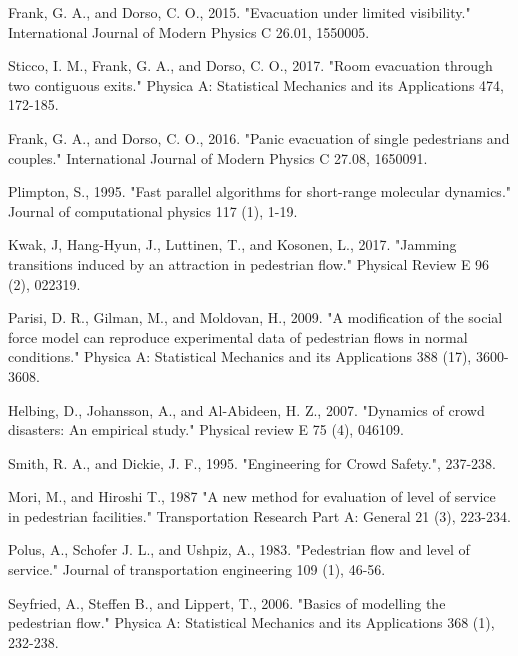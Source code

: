\documentclass[preprint,12pt]{elsarticle}
\begin{document}
\begin{thebibliography}{10}
Frank, G. A., and Dorso, C. O., 2015. "Evacuation under limited 
visibility." International Journal of Modern Physics C 26.01, 1550005.
{}

Sticco, I. M., Frank, G. A., and Dorso, C. O., 2017. "Room evacuation 
through two contiguous exits." Physica A: Statistical Mechanics and its 
Applications 474, 172-185. 
{}

Frank, G. A., and Dorso, C. O., 2016. "Panic evacuation of single pedestrians 
and couples." International Journal of Modern Physics C 27.08, 1650091. 
{}

Plimpton, S., 1995. "Fast parallel algorithms for short-range molecular 
dynamics." Journal of computational physics 117 (1), 1-19.
{}

Kwak, J, Hang-Hyun, J., Luttinen, T., and Kosonen, L., 2017. "Jamming 
transitions induced by an attraction in pedestrian flow." Physical Review E 96 
(2), 022319.
{}

Parisi, D. R., Gilman, M., and Moldovan, H., 2009. "A modification of the 
social force model can reproduce experimental data of pedestrian flows in normal 
conditions." Physica A: Statistical Mechanics and its Applications 388 
(17), 3600-3608.
{}

Helbing, D., Johansson, A., and Al-Abideen, H. Z., 2007. "Dynamics of crowd 
disasters: An empirical study." Physical review E 75 (4), 046109.
{}

Smith, R. A., and Dickie, J. F., 1995. "Engineering for Crowd Safety.", 237-238.

Mori, M., and Hiroshi T., 1987 "A new method for evaluation of level of 
service in pedestrian facilities." Transportation Research Part A: General 
21 (3), 223-234.
{}

Polus, A., Schofer J. L., and Ushpiz, A., 1983. "Pedestrian flow and level 
of service." Journal of transportation engineering 109 (1), 46-56.
{}

Seyfried, A., Steffen B., and Lippert, T., 2006. "Basics of modelling the 
pedestrian flow." Physica A: Statistical Mechanics and its Applications 368 
(1), 232-238.
{}


\end{thebibliography}
\end{document}
